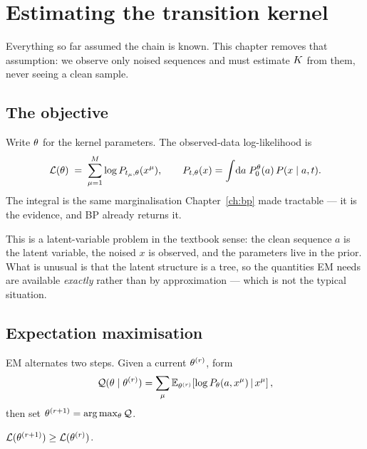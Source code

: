 \chapter{Estimating the transition kernel}
\label{ch:estimation}

Everything so far assumed the chain is known. This chapter removes that assumption: we observe
only noised sequences and must estimate $K$ from them, never seeing a clean sample.

\section{The objective}

Write $\theta$ for the kernel parameters. The observed-data log-likelihood is
\begin{equation}
\label{eq:marginal-lik}
\mathcal{L}(\theta) \;=\; \sum_{\mu=1}^{M} \log P_{t_\mu,\theta}(x^\mu),
\qquad
P_{t,\theta}(x) = \int\!\mathrm{d}a\; P_0^\theta(a)\, P(x\mid a,t) .
\end{equation}
The integral is the same marginalisation Chapter~\ref{ch:bp} made tractable --- it is the
evidence, and BP already returns it.

\begin{intuition}
This is a latent-variable problem in the textbook sense: the clean sequence $a$ is the latent
variable, the noised $x$ is observed, and the parameters live in the prior. What is unusual is
that the latent structure is a tree, so the quantities EM needs are available \emph{exactly}
rather than by approximation --- which is not the typical situation.
\end{intuition}

\section{Expectation maximisation}

EM alternates two steps. Given a current $\theta^{(r)}$, form
\begin{equation}
\label{eq:qfun}
\mathcal{Q}(\theta\mid\theta^{(r)})
= \sum_\mu \mathbb{E}_{\theta^{(r)}}\!\left[\log P_\theta(a, x^\mu)\,\middle|\, x^\mu\right],
\end{equation}
then set $\theta^{(r+1)} = \arg\max_\theta \mathcal{Q}$.

\begin{proposition}
$\mathcal{L}(\theta^{(r+1)}) \ge \mathcal{L}(\theta^{(r)})$.
\end{proposition}

